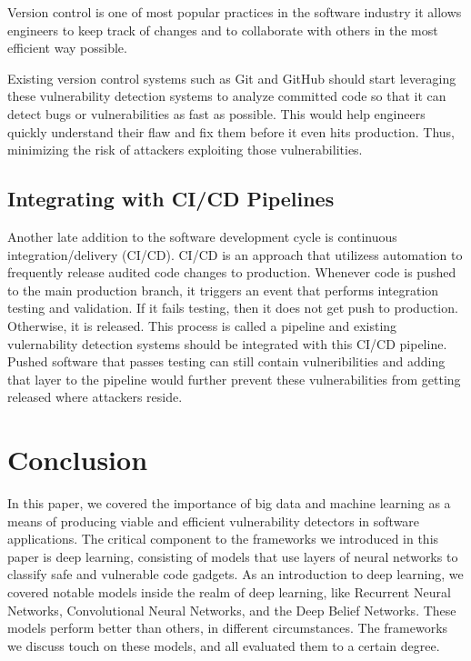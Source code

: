 \documentclass[12pt,twocolumn,letterpaper]{article}
\begin{document}
Version control is one of most popular practices in the software industry it allows engineers to keep track 
of changes and to collaborate with others in the most efficient way possible. 

Existing version control systems such as Git \cite{Torvalds05} and GitHub \cite{Werner08} should start leveraging these vulnerability 
detection systems to analyze committed code so that it can detect bugs or vulnerabilities as fast as 
possible. This would help engineers quickly understand their flaw and fix them before it even hits production.
Thus, minimizing the risk of attackers exploiting those vulnerabilities.

\subsection{Integrating with CI/CD Pipelines}
\label{sub:integrating-with-cicd-pipelines}

Another late addition to the software development cycle is continuous integration/delivery (CI/CD). 
CI/CD is an approach that utilizess automation to frequently release audited code changes to production. 
Whenever code is pushed to the main production branch, it triggers an event that performs integration 
testing and validation. If it fails testing, then it does not get push to production. Otherwise, it is 
released. This process is called a pipeline and existing vulernability detection systems should be integrated 
with this CI/CD pipeline. Pushed software that passes testing can still contain vulneribilities and adding 
that layer to the pipeline would further prevent these vulnerabilities from getting released where attackers 
reside.

\section{Conclusion}
\label{sec:conclusion}
In this paper, we covered the importance of big data and machine learning as a means of producing viable and efficient vulnerability detectors in software applications.
The critical component to the frameworks we introduced in this paper is deep learning, consisting of models that use layers of neural networks to classify safe and vulnerable code gadgets.
As an introduction to deep learning, we covered notable models inside the realm of deep learning, like Recurrent Neural Networks, Convolutional Neural Networks, and the Deep Belief Networks.
These models perform better than others, in different circumstances. The frameworks we discuss touch on these models, and all evaluated them to a certain degree.
\end{document}
